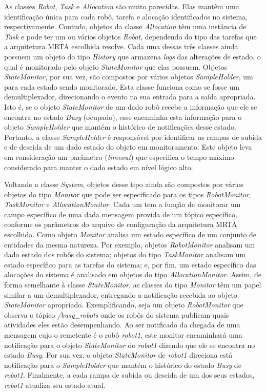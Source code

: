         As classes \textit{Robot}, \textit{Task} e \textit{Allocation} são muito parecidas. Elas mantêm uma identificação única para cada robô, tarefa e alocação identificados no sistema, respectivamente. Contudo, objetos da classe \textit{Allocation} têm uma instância de \textit{Task} e pode ter um ou vários objetos \textit{Robot}, dependendo do tipo das tarefas que a arquitetura MRTA escolhida resolve. Cada uma dessas três classes ainda possuem um objeto do tipo \textit{History} que armazena \textit{logs} das alterações de estado, o qual é monitorado pelo objeto \textit{StateMonitor} que elas possuem. Objetos \textit{StateMonitor}, por sua vez, são compostos por vários objetos \textit{SampleHolder}, um para cada estado sendo monitorado. Esta classe funciona como se fosse um demultiplexador, direcionando o evento na sua entrada para a saída apropriada. Isto é, se o objeto \textit{StateMonitor} de um dado robô recebe a informação que ele se encontra no estado \textit{Busy} (ocupado), esse encaminha esta informação para o objeto \textit{SampleHolder} que mantém o histórico de notificações desse estado. Portanto, a classe \textit{SampleHolder} é responsável por identificar as rampas de subida e de descida de um dado estado do objeto em monitoramento. Este objeto leva em consideração um parâmetro (\textit{timeout}) que especifica o tempo máximo considerado para manter o dado estado em nível lógico alto.
        
        Voltando a classe \textit{System}, objetos desse tipo ainda são compostos por vários objetos do tipo \textit{Monitor} que pode ser especificado para os tipos \textit{RobotMonitor}, \textit{TaskMonitor} e \textit{AllocationMonitor}. Cada um tem a função de monitorar um campo específico de uma dada mensagem provida de um tópico específico, conforme os parâmetros do arquivo de configuração da arquitetura MRTA escolhida.  Como objeto \textit{Monitor} analisa um estado específico de um conjunto de entidades da mesma natureza. Por exemplo, objetos \textit{RobotMonitor} analisam um dado estado dos robôs do sistema; objetos do tipo \textit{TaskMonitor} analisam um estado específico para as tarefas do sistema; e, por fim, um estado específico das alocações do sistema é analisado em objetos do tipo \textit{AllocationMonitor}. Assim, de forma semelhante à classe \textit{StateMonitor}, as classes do tipo \textit{Monitor} têm um papel similar a um demultiplexador, entregando a notificação recebida ao objeto \textit{StateMonitor} apropriado. Exemplificando, seja um objeto \textit{RobotMonitor} que observa o tópico \textit{/busy\_robots} onde os robôs do sistema publicam quais atividades eles estão desempenhando. Ao ser notificado da chegada de uma mensagem cujo o remetente é o robô \textit{robot1}, este monitor encaminhará uma notificação para o objeto \textit{StateMonitor} do \textit{robot1} dizendo que ele se encontra no estado \textit{Busy}. Por sua vez, o objeto \textit{StateMonitor} de \textit{robot1} direciona está notificação para o \textit{SampleHolder} que mantém o histórico do estado \textit{Busy} de \textit{robot1}. Finalmente, a cada rampa de subida ou descida de um dos seus estados, \textit{robot1} atualiza seu estado atual.
        
